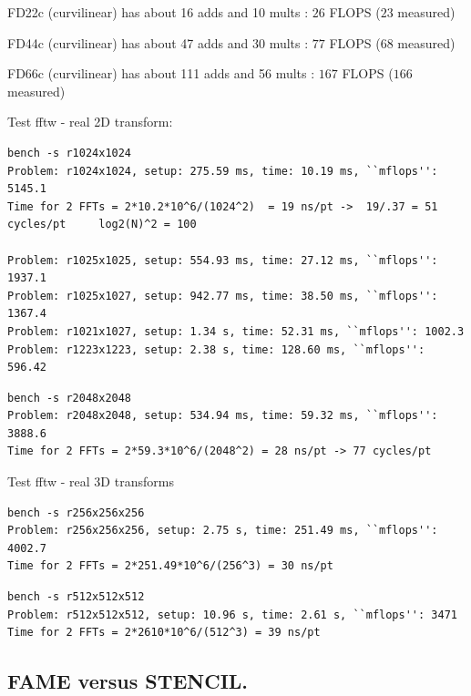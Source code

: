 \mni
FD22c (curvilinear) has about 16 adds and 10 mults : $26$ FLOPS ($23$ measured)

\mni
FD44c (curvilinear) has about 47 adds and 30 mults : $77$ FLOPS ($68$ measured)

\mni
FD66c (curvilinear) has about 111 adds and 56 mults : $167$ FLOPS ($166$ measured)

\clearpage
\mni
Test fftw - real 2D transform: 
\begin{Verbatim}[fontsize=\small]
bench -s r1024x1024
Problem: r1024x1024, setup: 275.59 ms, time: 10.19 ms, ``mflops'': 5145.1
Time for 2 FFTs = 2*10.2*10^6/(1024^2)  = 19 ns/pt ->  19/.37 = 51 cycles/pt     log2(N)^2 = 100 

Problem: r1025x1025, setup: 554.93 ms, time: 27.12 ms, ``mflops'': 1937.1
Problem: r1025x1027, setup: 942.77 ms, time: 38.50 ms, ``mflops'': 1367.4
Problem: r1021x1027, setup: 1.34 s, time: 52.31 ms, ``mflops'': 1002.3
Problem: r1223x1223, setup: 2.38 s, time: 128.60 ms, ``mflops'': 596.42

\end{Verbatim}
\begin{Verbatim}[fontsize=\small]
bench -s r2048x2048
Problem: r2048x2048, setup: 534.94 ms, time: 59.32 ms, ``mflops'': 3888.6
Time for 2 FFTs = 2*59.3*10^6/(2048^2) = 28 ns/pt -> 77 cycles/pt
\end{Verbatim}

Test fftw - real 3D transforms
\begin{Verbatim}[fontsize=\small]
bench -s r256x256x256
Problem: r256x256x256, setup: 2.75 s, time: 251.49 ms, ``mflops'': 4002.7
Time for 2 FFTs = 2*251.49*10^6/(256^3) = 30 ns/pt
\end{Verbatim}
\begin{Verbatim}[fontsize=\small]
 bench -s r512x512x512
Problem: r512x512x512, setup: 10.96 s, time: 2.61 s, ``mflops'': 3471
Time for 2 FFTs = 2*2610*10^6/(512^3) = 39 ns/pt
\end{Verbatim}


\clearpage
\subsection{FAME versus STENCIL.} %


